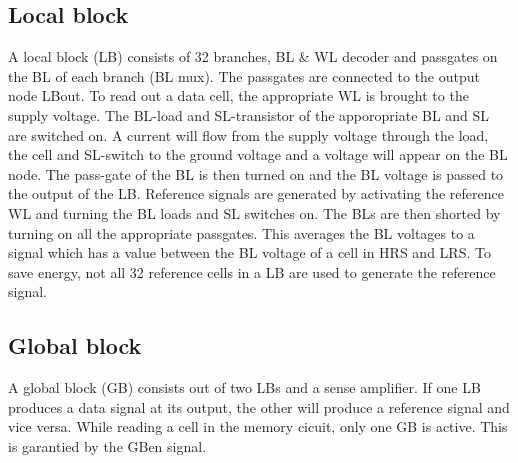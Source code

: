 \documentclass[journal]{IEEEtran}
\begin{document}
\subsection{Local block}
A local block (LB) consists of 32 branches, BL \& WL decoder and passgates on the BL of each branch (BL mux). The passgates are connected to the output node LBout. To read out a data cell, the appropriate WL is brought to the supply voltage. The BL-load and SL-transistor of the apporopriate BL and SL are switched on. A current will flow from the supply voltage through the load, the cell and SL-switch to the ground voltage and a voltage will appear on the BL node. The pass-gate of the BL is then turned on and the BL voltage is passed to the output of the LB. Reference signals are generated by activating the reference WL and turning the BL loads and SL switches on. The BLs are then shorted by turning on all the appropriate passgates. This averages the BL voltages to a signal which has a value between the BL voltage of a cell in HRS and LRS. To save energy, not all 32 reference cells in a LB are used to generate the reference signal.

\subsection{Global block} 
A global block (GB) consists out of two LBs and a sense amplifier. If one LB produces a data signal at its output, the other will produce a reference signal and vice versa. While reading a cell in the memory cicuit, only one GB is active. This is garantied by the GBen signal.
\end{document}
